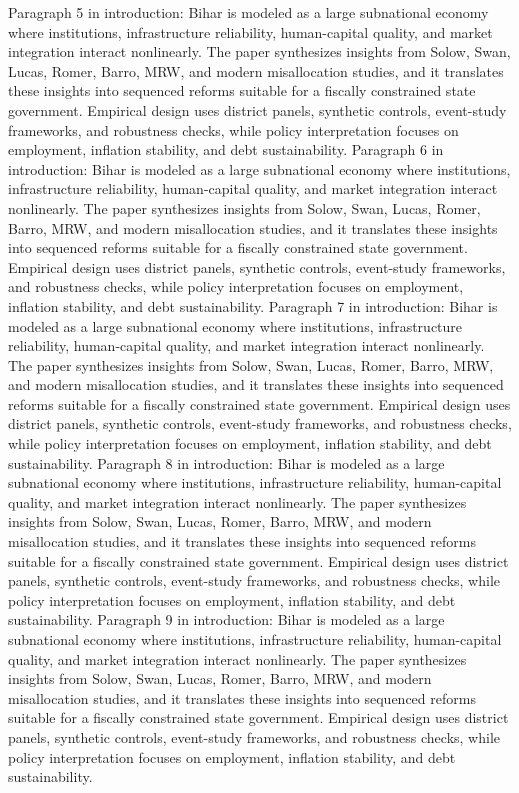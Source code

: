 \documentclass[preprint,12pt]{elsarticle}
\begin{document}
Paragraph 5 in introduction: Bihar is modeled as a large subnational economy where institutions, infrastructure reliability, human-capital quality, and market integration interact nonlinearly. The paper synthesizes insights from Solow, Swan, Lucas, Romer, Barro, MRW, and modern misallocation studies, and it translates these insights into sequenced reforms suitable for a fiscally constrained state government. Empirical design uses district panels, synthetic controls, event-study frameworks, and robustness checks, while policy interpretation focuses on employment, inflation stability, and debt sustainability.
Paragraph 6 in introduction: Bihar is modeled as a large subnational economy where institutions, infrastructure reliability, human-capital quality, and market integration interact nonlinearly. The paper synthesizes insights from Solow, Swan, Lucas, Romer, Barro, MRW, and modern misallocation studies, and it translates these insights into sequenced reforms suitable for a fiscally constrained state government. Empirical design uses district panels, synthetic controls, event-study frameworks, and robustness checks, while policy interpretation focuses on employment, inflation stability, and debt sustainability.
Paragraph 7 in introduction: Bihar is modeled as a large subnational economy where institutions, infrastructure reliability, human-capital quality, and market integration interact nonlinearly. The paper synthesizes insights from Solow, Swan, Lucas, Romer, Barro, MRW, and modern misallocation studies, and it translates these insights into sequenced reforms suitable for a fiscally constrained state government. Empirical design uses district panels, synthetic controls, event-study frameworks, and robustness checks, while policy interpretation focuses on employment, inflation stability, and debt sustainability.
Paragraph 8 in introduction: Bihar is modeled as a large subnational economy where institutions, infrastructure reliability, human-capital quality, and market integration interact nonlinearly. The paper synthesizes insights from Solow, Swan, Lucas, Romer, Barro, MRW, and modern misallocation studies, and it translates these insights into sequenced reforms suitable for a fiscally constrained state government. Empirical design uses district panels, synthetic controls, event-study frameworks, and robustness checks, while policy interpretation focuses on employment, inflation stability, and debt sustainability.
Paragraph 9 in introduction: Bihar is modeled as a large subnational economy where institutions, infrastructure reliability, human-capital quality, and market integration interact nonlinearly. The paper synthesizes insights from Solow, Swan, Lucas, Romer, Barro, MRW, and modern misallocation studies, and it translates these insights into sequenced reforms suitable for a fiscally constrained state government. Empirical design uses district panels, synthetic controls, event-study frameworks, and robustness checks, while policy interpretation focuses on employment, inflation stability, and debt sustainability.
\end{document}
